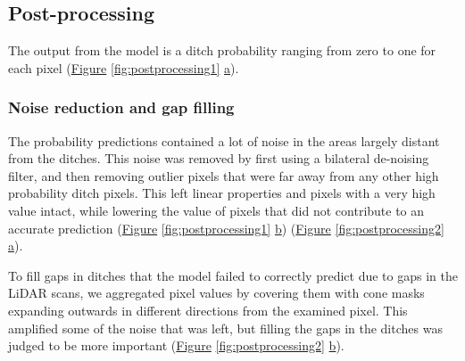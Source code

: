 \documentclass[11pt, review]{elsarticle} %
\begin{document}
\subsection{Post-processing}

The output from the model is a ditch probability ranging from zero to one for each pixel (\hyperref[fig:postprocessing1]{Figure} \ref{fig:postprocessing1} \hyperref[fig:postprocessing1]{a}).

\subsubsection{Noise reduction and gap filling}

The probability predictions contained a lot of noise in the areas largely distant from the ditches. This noise was removed by first using a bilateral de-noising filter, and then removing outlier pixels that were far away from any other high probability ditch pixels. This left linear properties and pixels with a very high value intact, while lowering the value of pixels that did not contribute to an accurate prediction (\hyperref[fig:postprocessing1]{Figure} \ref{fig:postprocessing1} \hyperref[fig:postprocessing1]{b}) (\hyperref[fig:postprocessing2]{Figure} \ref{fig:postprocessing2} \hyperref[fig:postprocessing2]{a}).

To fill gaps in ditches that the model failed to correctly predict due to gaps in the LiDAR scans, we aggregated pixel values by covering them with cone masks expanding outwards in different directions from the examined pixel. This amplified some of the noise that was left, but filling the gaps in the ditches was judged to be more important (\hyperref[fig:postprocessing2]{Figure} \ref{fig:postprocessing2} \hyperref[fig:postprocessing2]{b}).
\end{document}
